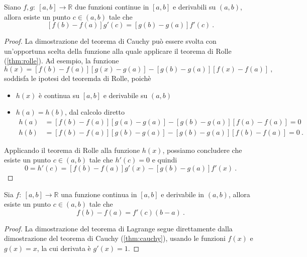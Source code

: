 \begin{theorem}\label{thm:cauchy} Siano $f, g: \ [a,b] \rightarrow \mathbb{R}$ due funzioni continue in $[a,b]$ e derivabili su $(a,b)$, allora esiste un punto $c \in (a,b)$ tale che
    \begin{equation}
        \left[ f(b) - f(a)  \right]g'(c) = \left[ g(b) - g(a)  \right]f'(c) \ .
    \end{equation}
\end{theorem}
\begin{proof}
  La dimostrazione del teorema di Cauchy può essere svolta con un'opportuna scelta della funzione alla quale applicare il teorema di Rolle (\ref{thm:rolle}). Ad esempio, la funzione
    \begin{equation}
       h(x) = [f(b) - f(a)] [ g(x) - g(a)] - [g(b)-g(a)] [f(x) - f(a)] \ ,
    \end{equation}
    soddisfa le ipotesi del teoremda di Rolle, poichè
    \begin{itemize}
        \item $h(x)$ è continua su $[a,b]$ e derivabile su $(a,b)$
        \item $h(a) = h(b)$, dal calcolo diretto
            \begin{equation}
                \begin{aligned}
                    h(a) & = [f(b) - f(a)] [ g(a) - g(a)] - [g(b)-g(a)] [f(a) - f(a)] = 0 \\ 
                    h(b) & = [f(b) - f(a)] [ g(b) - g(a)] - [g(b)-g(a)] [f(b) - f(a)] = 0  \ .
                \end{aligned}
            \end{equation}
    \end{itemize}
    Applicando il teorema di Rolle alla funzione $h(x)$, possiamo concludere che esiste un punto $c \in (a,b)$ tale che $h'(c) = 0$ e quindi
    \begin{equation}
        0 = h'(c) = [f(b) - f(a)] g'(x) - [g(b)-g(a)] f'(x) \ .
    \end{equation}
\end{proof}

\begin{theorem}\label{thm:lagrange} Sia $f: \ [a,b] \rightarrow \mathbb{R}$ una funzione continua in $[a,b]$ e derivabile in $(a,b)$, allora esiste un punto $c \in (a,b)$ tale che
    \begin{equation}
        f(b) - f(a) = f'(c) (b-a) \ .
    \end{equation}
\end{theorem}
\begin{proof}
    La dimostrazione del teorema di Lagrange segue direttamente dalla dimostrazione del teorema di Cauchy (\ref{thm:cauchy}), usando le funzioni $f(x)$ e $g(x) = x$, la cui derivata è $g'(x) = 1$.
\end{proof}

